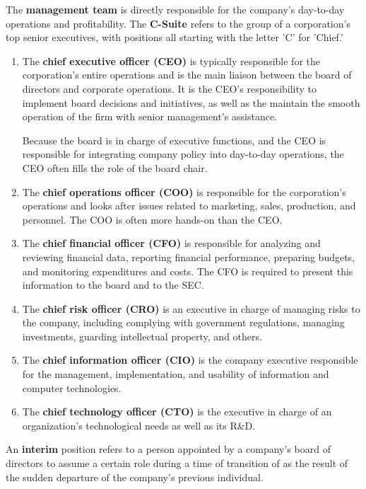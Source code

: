 \documentclass{article}
\begin{document}
    \begin{definition}
      The \textbf{management team} is directly responsible for the company's day-to-day operations and profitability. The \textbf{C-Suite} refers to the group of a corporation's top senior executives, with positions all starting with the letter 'C' for 'Chief.'
      \begin{enumerate}
        \item The \textbf{chief executive officer (CEO)} is typically responsible for the corporation's entire operations and is the main liaison between the board of directors and corporate operations. It is the CEO's responsibility to implement board decisions and initiatives, as well as the maintain the smooth operation of the firm with senior management's assistance. 
        
        Because the board is in charge of executive functions, and the CEO is responsible for integrating company policy into day-to-day operations, the CEO often fills the role of the board chair. 
        \item The \textbf{chief operations officer (COO)} is responsible for the corporation's operations and looks after issues related to marketing, sales, production, and personnel. The COO is often more hands-on than the CEO. 
        \item The \textbf{chief financial officer (CFO)} is responsible for analyzing and reviewing financial data, reporting financial performance, preparing budgets, and monitoring expenditures and costs. The CFO is required to present this information to the board and to the SEC. 
        \item The \textbf{chief risk officer (CRO)} is an executive in charge of managing risks to the company, including complying with government regulations, managing investments, guarding intellectual property, and others. 
        \item The \textbf{chief information officer (CIO)} is the company executive responsible for the management, implementation, and usability of information and computer technologies. 
        \item The \textbf{chief technology officer (CTO)} is the executive in charge of an organization's technological needs as well as its R\&D. 
      \end{enumerate}
      An \textbf{interim} position refers to a person appointed by a company's board of directors to assume a certain role during a time of transition of as the result of the sudden departure of the company's previous individual.
    \end{definition}
\end{document}
